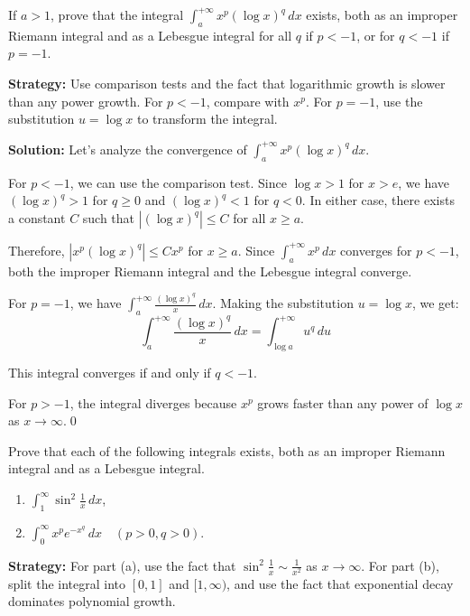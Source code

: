 \begin{problembox}
If $a > 1$, prove that the integral $\int_{a}^{+\infty} x^p (\log x)^q \, dx$ exists, both as an improper Riemann integral and as a Lebesgue integral for all $q$ if $p < -1$, or for $q < -1$ if $p = -1$.
\end{problembox}

\noindent\textbf{Strategy:} Use comparison tests and the fact that logarithmic growth is slower than any power growth. For $p < -1$, compare with $x^p$. For $p = -1$, use the substitution $u = \log x$ to transform the integral.

\bigskip\noindent\textbf{Solution:}
Let's analyze the convergence of $\int_{a}^{+\infty} x^p (\log x)^q \, dx$.

For $p < -1$, we can use the comparison test. Since $\log x > 1$ for $x > e$, we have $(\log x)^q > 1$ for $q \geq 0$ and $(\log x)^q < 1$ for $q < 0$. In either case, there exists a constant $C$ such that $|(\log x)^q| \leq C$ for all $x \geq a$.

Therefore, $|x^p (\log x)^q| \leq C x^p$ for $x \geq a$. Since $\int_{a}^{+\infty} x^p \, dx$ converges for $p < -1$, both the improper Riemann integral and the Lebesgue integral converge.

For $p = -1$, we have $\int_{a}^{+\infty} \frac{(\log x)^q}{x} \, dx$. Making the substitution $u = \log x$, we get:
\[\int_{a}^{+\infty} \frac{(\log x)^q}{x} \, dx = \int_{\log a}^{+\infty} u^q \, du\]

This integral converges if and only if $q < -1$.

For $p > -1$, the integral diverges because $x^p$ grows faster than any power of $\log x$ as $x \to \infty$.\qed


\begin{problembox}
Prove that each of the following integrals exists, both as an improper Riemann integral and as a Lebesgue integral.
\begin{enumerate}[label=(\alph*)]
\item $\int_{1}^{\infty} \sin^2 \frac{1}{x} \, dx$,
\item $\int_{0}^{\infty} x^pe^{-x^q} \, dx \quad (p > 0, q > 0)$.
\end{enumerate}
\end{problembox}

\noindent\textbf{Strategy:} For part (a), use the fact that $\sin^2 \frac{1}{x} \sim \frac{1}{x^2}$ as $x \to \infty$. For part (b), split the integral into $[0,1]$ and $[1,\infty)$, and use the fact that exponential decay dominates polynomial growth.

